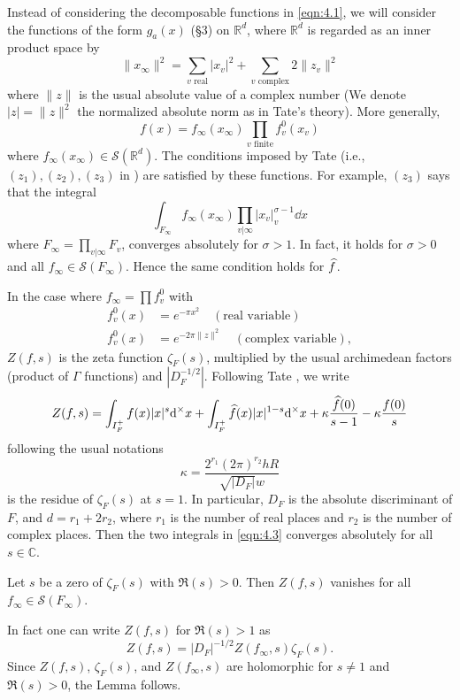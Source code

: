 Instead of considering the decomposable functions in \eqref{eqn:4.1}, we will consider the functions of the form $g_{a}(x)$ (\S 3) on $\mathbb{R}^{d}$, where $\mathbb{R}^{d}$ is regarded as an inner product space by
\[
    \|x_\infty\|^{2} = \sum_{v \text{ real}} |x_v|^{2} + \sum_{v \text{ complex}} 2 \|z_{v}\|^{2}
\]
where $\|z\|$ is the usual absolute value of a complex number (We denote $|z| = \|z\|^{2}$ the normalized absolute norm as in Tate's theory).
More generally,
\begin{equation}
    \label{eqn:4.2}
    f(x) = f_\infty(x_\infty) \prod_{v\text{ finite}} f_v^0(x_v)
\end{equation}
where $f_\infty(x_\infty) \in \mathcal{S}(\mathbb{R}^{d})$.
The conditions imposed by Tate (i.e., $(z_1), (z_2), (z_3)$ in \cite[\S 4.4]{tate1967fourier}) are satisfied by these functions.
For example, $(z_3)$ says that the integral
\[
    \int_{F_\infty} f_\infty(x_\infty) \prod_{v|\infty} |x_v|_v^{\sigma - 1} \dd x
\]
where $F_\infty = \prod_{v|\infty}F_v$, converges absolutely for $\sigma > 1$.
In fact, it holds for $\sigma > 0$ and all $f_\infty \in \mathcal{S}(F_\infty)$.
Hence the same condition holds for $\widehat{f}$.

In the case where $f_\infty = \prod f_v^0$ with
\begin{align*}
    f_v^0(x) &= e^{-\pi x^2} \quad (\text{real variable}) \\
    f_v^0(x) &= e^{-2 \pi \|z\|^{2}} \quad (\text{complex variable}),
\end{align*}
$Z(f, s)$ is the zeta function $\zeta_F(s)$, multiplied by the usual archimedean factors (product of $\Gamma$ functions) and $|D_F^{-1/2}|$.
Following Tate \cite{tate1967fourier}, we write
\begin{equation}
    \label{eqn:4.3}
    Z(f, s) = \int_{I_F^{+}} f(x) |x|^{s} \mathrm{d}^\times x + \int_{I_F^{+}} \widehat{f}(x)|x|^{1-s} \mathrm{d}^\times x + \kappa \frac{\widehat{f}(0)}{s - 1} - \kappa \frac{f(0)}{s}
\end{equation}
following the usual notations \cite[Th\'eor\`eme 4.3.2]{tate1967fourier}
\[
    \kappa = \frac{2^{r_1}(2 \pi)^{r_2} h R}{\sqrt{|D_F|}w}
\]
is the residue of $\zeta_F(s)$ at $s = 1$.
In particular, $D_F$ is the absolute discriminant of $F$, and $d = r_1 + 2 r_2$, where $r_1$ is the number of real places and $r_2$ is the number of complex places.
Then the two integrals in \eqref{eqn:4.3} converges absolutely for all $s \in \mathbb{C}$.


\begin{lemma}
\label{lem:4.1}
Let $s$ be a zero of $\zeta_F(s)$ with $\Re(s) > 0$.
Then $Z(f, s)$ vanishes for all $f_\infty \in \mathcal{S}(F_\infty)$.
\end{lemma}
In fact one can write $Z(f, s)$ for $\Re(s) > 1$ as
\[
    Z(f, s) = |D_F|^{-1/2} Z(f_\infty, s) \zeta_F(s).
\]
Since $Z(f, s)$, $\zeta_F(s)$, and $Z(f_\infty, s)$ are holomorphic for $s \neq 1$ and $\Re (s) > 0$, the Lemma follows.

